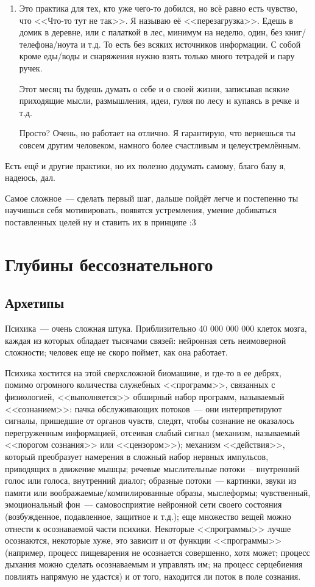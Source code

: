 \documentclass[a5paper,12pt,twoside]{memoir}
\begin{document}
\begin{enumerate}
\item Это практика для тех, кто уже чего-то добился, но всё равно есть чувство, что <<Что-то тут не так>>. Я называю её <<перезагрузка>>. Едешь в домик в деревне, или с палаткой в лес, минимум на неделю, один, без книг/телефона/ноута и т.д. То есть без всяких источников информации. С собой кроме еды/воды и снаряжения нужно взять только много тетрадей и пару ручек.

Этот месяц ты будешь думать о себе и о своей жизни, записывая всякие приходящие мысли, размышления, идеи, гуляя по лесу и купаясь в речке и т.д.

Просто? Очень, но работает на отлично. Я гарантирую, что вернешься ты совсем другим человеком, намного более счастливым и целеустремлённым.
\end{enumerate}

Есть ещё и другие практики, но их полезно додумать самому, благо базу я, надеюсь, дал.

Самое сложное~--- сделать первый шаг, дальше пойдёт легче и постепенно ты научишься себя мотивировать, появятся устремления, умение добиваться поставленных целей ну и ставить их в принципе :3



\chapter{Глубины бессознательного}



\section{Архетипы}

Психика~--- очень сложная штука. Приблизительно 40 000 000 000 клеток мозга, каждая из которых обладает тысячами связей: нейронная сеть неимоверной сложности; человек еще не скоро поймет, как она работает.

Психика хостится на этой сверхсложной биомашине, и где-то в ее дебрях, помимо огромного количества служебных <<программ>>, связанных с физиологией, <<выполняется>> обширный набор программ, называемый <<сознанием>>: пачка обслуживающих потоков~--- они интерпретируют сигналы, пришедшие от органов чувств, следят, чтобы сознание не оказалось перегруженным информацией, отсеивая слабый сигнал (механизм, называемый <<порогом сознания>> или <<цензором>>); механизм <<действия>>, который преобразует намерения в сложный набор нервных импульсов, приводящих в движение мышцы; речевые мыслительные потоки~-- внутренний голос или голоса, внутренний диалог; образные потоки~--- картинки, звуки из памяти или воображаемые/компилированные образы, мыслеформы; чувственный, эмоциональный фон~--- самовосприятие нейронной сети своего состояния (возбужденное, подавленное, защитное и т.д.); еще множество вещей можно отнести к осознаваемой части психики. Некоторые <<программы>> лучше осознаются, некоторые хуже, это зависит и от функции <<программы>> (например, процесс пищеварения не осознается совершенно, хотя может; процесс дыхания можно сделать осознаваемым и управлять им; на процесс серцебиения повлиять напрямую не удастся) и от того, находится ли поток в поле сознания.
\end{document}
